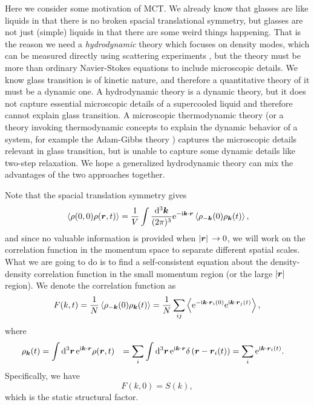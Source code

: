 \documentclass[hyperref, a4paper]{article}
\newcommand*{\ii}{\mathrm{i}}
\newcommand*{\ee}{\mathrm{e}}
\def\\{}%
\begin{document}
Here we consider some motivation of MCT. We already know that glasses are like liquids in that there is no 
broken spacial translational symmetry, but glasses are not just (simple) liquids in that there are some 
weird things happening. That is the reason we need a \emph{hydrodynamic} theory which focuses on density 
modes, which can be measured directly using scattering experiments \cite{mct2005}, but the theory must
be more than ordinary Navier-Stokes equations to include microscopic details. We know glass transition is 
of kinetic nature, and therefore a quantitative theory of it must be a dynamic one. A hydrodynamic theory 
is a dynamic theory, but it does not capture essential microscopic details of a supercooled liquid and 
therefore cannot explain glass transition. A microscopic thermodynamic theory (or a theory invoking thermodynamic 
concepts to explain the dynamic behavior of a system, for example the Adam-Gibbs theory \cite{Sengupta_2012})
captures the microscopic details relevant in glass transition, but is unable to capture some dynamic details
like two-step relaxation. We hope a generalized hydrodynamic theory can mix the advantages of the two 
approaches together.

Note that the spacial translation symmetry gives 
\begin{equation}
    \expval*{\rho(0, 0) \rho(\vb*{r}, t)} = \frac{1}{V} \int \frac{\dd[3]{\vb*{k}}}{(2\pi)^3} 
    \ee^{- \ii \vb*{k} \cdot \vb*{r}} \expval*{\rho_{-\vb*{k}}(0) \rho_{\vb*{k}}(t)},
\end{equation}
and since no valuable information is provided when $\abs*{\vb*{r}} \to 0$, we will work on the correlation function
in the momentum space to separate different spatial scales.
What we are going to do is to find a self-consistent equation about the density-density correlation function in 
the small momentum region (or the large $\abs*{\vb*{r}}$ region). We denote the correlation function as 
\begin{equation}
    F(k, t)=\frac{1}{N}\left\langle\rho_{-\vb*{k}}(0) \rho_{\vb*{k}}(t)\right\rangle=\frac{1}{N} \sum_{i j}\left\langle \ee^{-\ii \vb*{k} \cdot \vb*{r}_{i}(0)} \ee^{\ii \vb*{k} \cdot \vb*{r}_{j}(t)}\right\rangle,
\end{equation}
where 
\begin{equation}
    \begin{aligned}
        \rho_{\vb*{k}}(t) &= \int \dd[3]{\vb*{r}} \ee^{\ii \vb*{k} \cdot \vb*{r}} \rho(\vb*{r}, t) \\
        &=\sum_{i} \int \dd[3]{\vb*{r}} \ee^{\ii \vb*{k} \cdot \vb*{r}} \delta\left(\vb*{r}-\vb*{r}_{i}(t)\right) \\
        &=\sum_{i} \ee^{\ii \vb*{k} \cdot \vb*{r}_{i}(t)}.
    \end{aligned}
\end{equation}
Specifically, we have 
\begin{equation}
    F(k, 0) = S(k),
\end{equation}
which is the static structural factor.
\end{document}

